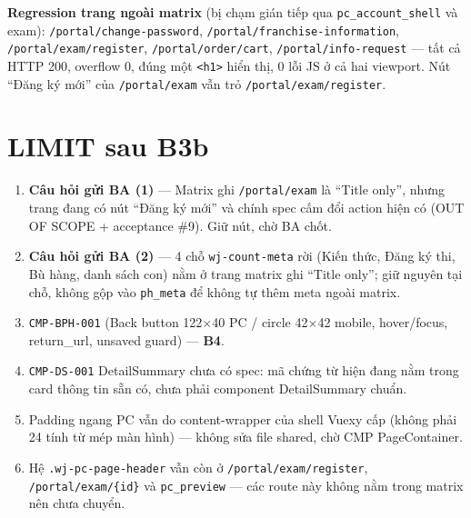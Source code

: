 \textbf{Regression trang ngoài matrix} (bị chạm gián tiếp qua \texttt{pc\_account\_shell} và
exam): \texttt{/portal/change-password}, \texttt{/portal/franchise-information},
\texttt{/portal/exam/register}, \texttt{/portal/order/cart}, \texttt{/portal/info-request} ---
tất cả HTTP 200, overflow 0, đúng một \texttt{<h1>} hiển thị, 0 lỗi JS ở cả hai viewport.
Nút ``Đăng ký mới'' của \texttt{/portal/exam} vẫn trỏ \texttt{/portal/exam/register}.

\section{LIMIT sau B3b}

\begin{enumerate}
\item \textbf{Câu hỏi gửi BA (1)} --- Matrix ghi \texttt{/portal/exam} là ``Title only'',
  nhưng trang đang có nút ``Đăng ký mới'' và chính spec cấm đổi action hiện có
  (OUT OF SCOPE + acceptance \#9). Giữ nút, chờ BA chốt.
\item \textbf{Câu hỏi gửi BA (2)} --- 4 chỗ \texttt{wj-count-meta} rời (Kiến thức, Đăng ký thi,
  Bù hàng, danh sách con) nằm ở trang matrix ghi ``Title only''; giữ nguyên tại chỗ, không gộp
  vào \texttt{ph\_meta} để không tự thêm meta ngoài matrix.
\item \texttt{CMP-BPH-001} (Back button 122$\times$40 PC / circle 42$\times$42 mobile,
  hover/focus, return\_url, unsaved guard) --- \textbf{B4}.
\item \texttt{CMP-DS-001} DetailSummary chưa có spec: mã chứng từ hiện đang nằm trong card
  thông tin sẵn có, chưa phải component DetailSummary chuẩn.
\item Padding ngang PC vẫn do content-wrapper của shell Vuexy cấp (không phải 24 tính từ mép
  màn hình) --- không sửa file shared, chờ CMP PageContainer.
\item Hệ \texttt{.wj-pc-page-header} vẫn còn ở \texttt{/portal/exam/register},
  \texttt{/portal/exam/\{id\}} và \texttt{pc\_preview} --- các route này không nằm trong
  matrix nên chưa chuyển.
\end{enumerate}
